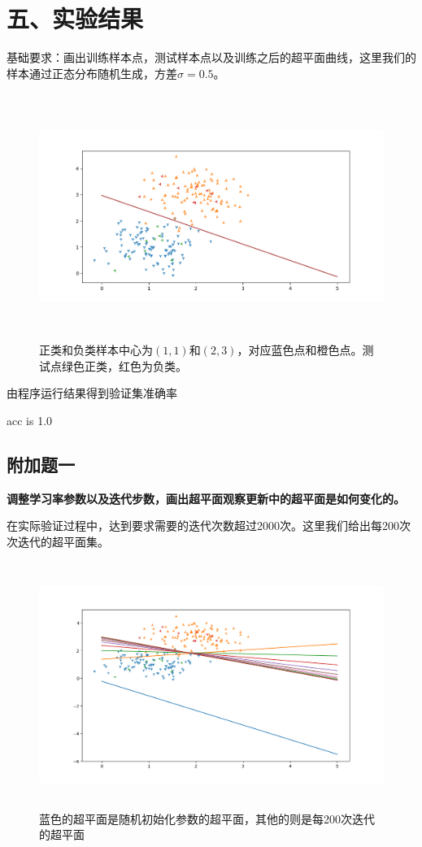 \documentclass{article}
\begin{document}
\section*{五、实验结果}
基础要求：画出训练样本点，测试样本点以及训练之后的超平面曲线，这里我们的样本通过正态分布随机生成，方差$\sigma=0.5$。
\begin{figure}[H]
    \centering
    \begin{minipage}[t]{1.0\linewidth}
        \centering
        \includegraphics[height=8cm]{Figure_1.png}
        \caption{正类和负类样本中心为$(1,1)$和$(2,3)$，对应蓝色点和橙色点。测试点绿色正类，红色为负类。}
    \end{minipage}
 \end{figure}
 由程序运行结果得到验证集准确率
 \begin{python}
    acc is 1.0
 \end{python}
 \subsection*{\Large 附加题一}
 {\large\textbf{调整学习率参数以及迭代步数，画出超平面观察更新中的超平面是如何变化的。}}


 在实际验证过程中，达到要求需要的迭代次数超过2000次。这里我们给出每200次次迭代的超平面集。
 \begin{figure}[H]
    \centering
    \begin{minipage}[t]{1.0\linewidth}
        \centering
        \includegraphics[height=8cm]{Figure_2.png}
        \caption{蓝色的超平面是随机初始化参数的超平面，其他的则是每200次迭代的超平面}
    \end{minipage}
 \end{figure}
\end{document}
